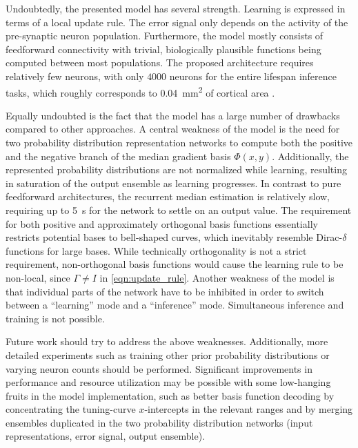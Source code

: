\documentclass[a4paper,11pt]{article}
\begin{document}
Undoubtedly, the presented model has several strength. Learning is expressed in terms of a local update rule. The error signal only depends on the activity of the pre-synaptic neuron population. Furthermore, the model mostly consists of feedforward connectivity with trivial, biologically plausible functions being computed between most populations. The proposed architecture requires relatively few neurons, with only $4000$ neurons for the entire lifespan inference tasks, which roughly corresponds to \SI{0.04}{\square\milli\meter} of cortical area \cite{carlo2013structural}.

Equally undoubted is the fact that the model has a large number of drawbacks compared to other approaches. A central weakness of the model is the need for two probability distribution representation networks to compute both the positive and the negative branch of the median gradient basis $\Phi(x, y)$. Additionally, the represented probability distributions are not normalized while learning, resulting in saturation of the output ensemble as learning progresses. In contrast to pure feedforward architectures, the recurrent median estimation is relatively slow, requiring up to \SI{5}{\second} for the network to settle on an output value.  The requirement for both positive and approximately orthogonal basis functions essentially restricts potential bases to bell-shaped curves, which inevitably resemble Dirac-$\delta$ functions for large bases. While technically orthogonality is not a strict requirement, non-orthogonal basis functions would cause the learning rule to be non-local, since $\Gamma \neq I$ in \cref{eqn:update_rule}. Another weakness of the model is that individual parts of the network have to be inhibited in order to switch between a \enquote{learning} mode and a \enquote{inference} mode. Simultaneous inference and training is not possible.

Future work should try to address the above weaknesses. Additionally, more detailed experiments such as training other prior probability distributions or varying neuron counts should be performed. Significant improvements in performance and resource utilization may be possible with some low-hanging fruits in the model implementation, such as better basis function decoding by concentrating the tuning-curve $x$-intercepts in the relevant ranges and by merging ensembles duplicated in the two probability distribution networks (input representations, error signal, output ensemble).



\pagebreak
\printbibliography
\end{document}
